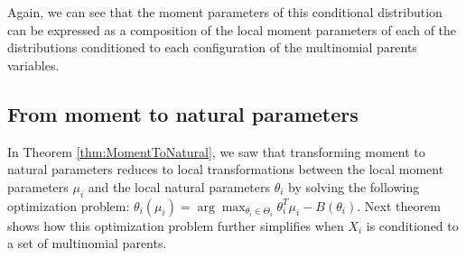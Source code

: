 \documentclass[11pt, oneside]{article}   	%
\numberwithin{figure}{section}
\numberwithin{equation}{section}
\numberwithin{table}{section}
\theoremstyle{definition}
\begin{document}
Again, we can see that the moment parameters of this conditional distribution can be expressed as a composition of the local moment parameters of each of the distributions conditioned to each configuration of the multinomial parents variables. 

\subsection{From moment to natural parameters} \label{Section:CD_With_MParents:MomentToNatural}


In Theorem \ref{thm:MomentToNatural}, we saw that transforming moment to natural parameters reduces to local transformations between the local moment parameters $\mu_i$ and the local natural parameters $\theta_i$ by solving the following optimization problem: $\theta_i(\mu_i) = \arg\max_{\theta_i\in\Theta_i} \theta_i^T\mu_i - B(\theta_i)$. Next theorem shows how this optimization problem further simplifies when $X_i$ is conditioned to a set of multinomial parents. 
\end{document}
